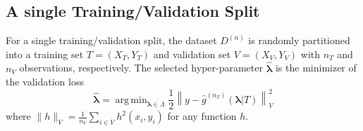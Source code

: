\documentclass[12pt]{article} %
\theoremstyle{definition}
\DeclareMathOperator*{\argmin}{arg\,min}
\begin{document}
\subsection{A single Training/Validation Split}\label{sec:single}

For a single training/validation split, the dataset $D^{(n)}$ is randomly partitioned into a training set $T = (X_T, Y_T)$ and validation set $V = (X_V, Y_V)$ with $n_T$ and $n_V$ observations, respectively. The selected hyper-parameter $\hat{\boldsymbol{\lambda}}$ is the minimizer of the validation loss
\begin{equation}
\label{eq:train_val_lambda}
\hat{\boldsymbol \lambda} = \argmin_{\boldsymbol{\lambda} \in\Lambda} \frac{1}{2} \left \| y-\hat{g}^{(n_T)}( \boldsymbol \lambda | T) \right \|_{V}^{2}
\end{equation}
where $\| h \|_{V}=\frac{1}{n_V}\sum_{i\in V} h^2(x_i, y_i)$ for any function $h$. 
\end{document}
